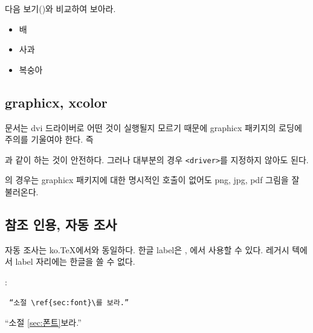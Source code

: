 \documentclass[
	12pt,
	a4paper,
	kosection,
	footnote,
	microtype,
	figtabcapt,
]{oblivoir}
\def\myREF#1#2{\ref{#1}}
\def\myREF#1#2{\ref{#2}}
\newcommand\obclass{ob\-liv\-oir\oblivoirallowbreak}
\begin{document}
다음 보기()와 비교하여 보아라.

\begin{itemize}
\item 배
\item 사과
\item 복숭아
\end{itemize}


\subsection{graphicx, xcolor}

 문서는 dvi 드라이버로 어떤 것이 실행될지 모르기 때문에 graphicx 패키지의
로딩에 주의를 기울여야 한다. 즉
\begin{boxedverbatim}
\usepackage[<driver>]{graphicx}
\end{boxedverbatim}
과 같이 하는 것이 안전하다. 그러나 대부분의 경우 \verb|<driver>|를 지정하지 않아도 된다.

 \LuaTeX 의 경우는 graphicx 패키지에 대한 명시적인 호출이 없어도 
png, jpg, pdf 그림을 잘 불러온다. %

\subsection{참조 인용, 자동 조사}

자동 조사는 ko.\TeX 에서와 동일하다.
한글 label은 \XeTeX, \LuaTeX 에서 사용할 수 있다.
레거시 텍에서 label 자리에는 한글을 쓸 수 없다. 

\medskip

\noindent{}:\\
\noindent\begin{minipage}{.45\textwidth}
\begin{verbatim}
 “소절 \ref{sec:font}\를 보라.”
\end{verbatim}
\end{minipage}\hfill
\begin{minipage}{.45\textwidth}
\hfill “소절 \myREF{sec:font}{sec:폰트}\를 보라.”
\end{minipage}
\end{document}
